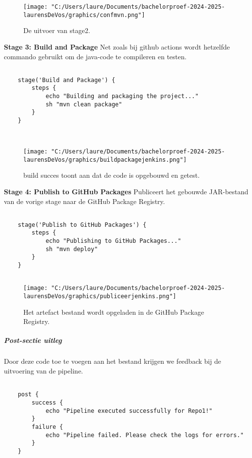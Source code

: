 \begin{figure}[h!]
    \centering
    \texttt{[image: "C:/Users/laure/Documents/bachelorproef-2024-2025-laurensDeVos/graphics/confmvn.png"]}
    \caption{De uitvoer van stage2.}
\end{figure}


\textbf{Stage 3: Build and Package}
Net zoals bij github actions wordt hetzelfde commando gebruikt om de java-code te compileren en testen.

\begin{verbatim}
    
    stage('Build and Package') {
        steps {
            echo "Building and packaging the project..."
            sh "mvn clean package"
        }
    }

    
\end{verbatim}

\begin{figure}[h!]
    \centering
    \texttt{[image: "C:/Users/laure/Documents/bachelorproef-2024-2025-laurensDeVos/graphics/buildpackagejenkins.png"]}
    \caption{build succes toont aan dat de code is opgebouwd en getest.}
\end{figure}

\textbf{Stage 4: Publish to GitHub Packages}
Publiceert het gebouwde JAR-bestand van de vorige stage naar de GitHub Package Registry. 

\begin{verbatim}
    
    stage('Publish to GitHub Packages') {
        steps {
            echo "Publishing to GitHub Packages..."
            sh "mvn deploy"
        }
    }
    
\end{verbatim}

\begin{figure}[h!]
    \centering
    \texttt{[image: "C:/Users/laure/Documents/bachelorproef-2024-2025-laurensDeVos/graphics/publiceerjenkins.png"]}
    \caption{Het artefact bestand wordt opgeladen in de GitHub Package Registry.}
\end{figure}

\subparagraph{Post-sectie uitleg}
Door deze code toe te voegen aan het bestand krijgen we feedback bij de uitvoering van de pipeline. 

\begin{verbatim}
    
    post {
        success {
            echo "Pipeline executed successfully for Repo1!"
        }
        failure {
            echo "Pipeline failed. Please check the logs for errors."
        }
    }

\end{verbatim}

